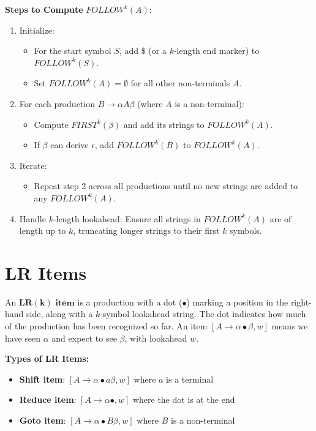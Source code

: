 \textbf{Steps to Compute} $FOLLOW^k(A)$:
\begin{enumerate}
\item Initialize:
   \begin{itemize}
   \item For the start symbol $S$, add $\$$ (or a $k$-length end marker) to $FOLLOW^k(S)$.
   \item Set $FOLLOW^k(A) = \emptyset$ for all other non-terminals $A$.
   \end{itemize}
\item For each production $B \to \alpha A \beta$ (where $A$ is a non-terminal):
   \begin{itemize}
   \item Compute $FIRST^k(\beta)$ and add its strings to $FOLLOW^k(A)$.
   \item If $\beta$ can derive $\epsilon$, add $FOLLOW^k(B)$ to $FOLLOW^k(A)$.
   \end{itemize}
\item Iterate:
   \begin{itemize}
   \item Repeat step 2 across all productions until no new strings are added to any $FOLLOW^k(A)$.
   \end{itemize}
\item Handle $k$-length lookahead: Ensure all strings in $FOLLOW^k(A)$ are of length up to $k$, truncating longer strings to their first $k$ symbols.
\end{enumerate}



\section{LR Items}

An $\mathbf{LR(k) \text{ item}}$ is a production with a dot ($\bullet$) marking a position in the right-hand side, along with a $k$-symbol lookahead string. The dot indicates how much of the production has been recognized so far. An item $[A \to \alpha \bullet \beta, w]$ means we have seen $\alpha$ and expect to see $\beta$, with lookahead $w$.

\textbf{Types of LR Items:}
\begin{itemize}
\item \textbf{Shift item}: $[A \to \alpha \bullet a \beta, w]$ where $a$ is a terminal
\item \textbf{Reduce item}: $[A \to \alpha \bullet, w]$ where the dot is at the end
\item \textbf{Goto item}: $[A \to \alpha \bullet B \beta, w]$ where $B$ is a non-terminal
\end{itemize}

